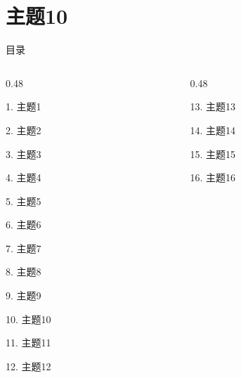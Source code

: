 \documentclass[aspectratio=169,10pt,fontset=fandol]{ctexbeamer}
\begin{document}
\section{主题10}
\begin{frame}[t,fragile]{目录}
\small
\begin{columns}[T,onlytextwidth]
\begin{column}{0.48\textwidth}
{\color{black}\small 1. 主题1\par}\vspace{0.22em}
{\color{black}\small 2. 主题2\par}\vspace{0.22em}
{\color{black}\small 3. 主题3\par}\vspace{0.22em}
{\color{black}\small 4. 主题4\par}\vspace{0.22em}
{\color{black}\small 5. 主题5\par}\vspace{0.22em}
{\color{black}\small 6. 主题6\par}\vspace{0.22em}
{\color{black}\small 7. 主题7\par}\vspace{0.22em}
{\color{black}\small 8. 主题8\par}\vspace{0.22em}
{\color{black}\small 9. 主题9\par}\vspace{0.22em}
{\color{blue}\small 10. 主题10\par}\vspace{0.22em}
{\color{gray!40}\small 11. 主题11\par}\vspace{0.22em}
{\color{gray!40}\small 12. 主题12\par}\vspace{0.22em}
\end{column}
\begin{column}{0.48\textwidth}
{\color{gray!40}\small 13. 主题13\par}\vspace{0.22em}
{\color{gray!40}\small 14. 主题14\par}\vspace{0.22em}
{\color{gray!40}\small 15. 主题15\par}\vspace{0.22em}
{\color{gray!40}\small 16. 主题16\par}\vspace{0.22em}

\end{column}
\end{columns}
\end{frame}
\end{document}
